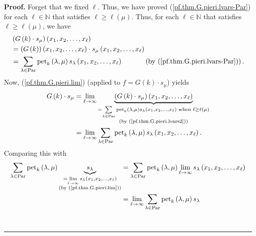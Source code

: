 \documentclass[numbers=enddot,12pt,final,onecolumn,notitlepage]{scrartcl}%
\theoremstyle{definition}
\newenvironment{proof}[1][Proof]{\noindent\textbf{#1.} }{\ \rule{0.5em}{0.5em}}
\let\sumnonlimits\sum
\renewcommand{\sum}{\sumnonlimits\limits}
\newenvironment{verlong}{}{}
\begin{document}
\begin{verlong}
\begin{proof}
Forget that we fixed $\ell$. Thus, we have proved
(\ref{pf.thm.G.pieri.lvars-Par}) for each $\ell\in\mathbb{N}$ that satisfies
$\ell\geq\ell\left(  \mu\right)  $. Thus, for each $\ell\in\mathbb{N}$ that
satisfies $\ell\geq\ell\left(  \mu\right)  $, we have%
\begin{align}
&  \left(  G\left(  k\right)  \cdot s_{\mu}\right)  \left(  x_{1},x_{2}%
,\ldots,x_{\ell}\right) \nonumber\\
&  =\left(  G\left(  k\right)  \right)  \left(  x_{1},x_{2},\ldots,x_{\ell
}\right)  \cdot s_{\mu}\left(  x_{1},x_{2},\ldots,x_{\ell}\right) \nonumber\\
&  =\sum_{\lambda\in\operatorname*{Par}}\operatorname*{pet}\nolimits_{k}%
\left(  \lambda,\mu\right)  s_{\lambda}\left(  x_{1},x_{2},\ldots,x_{\ell
}\right)  \ \ \ \ \ \ \ \ \ \ \left(  \text{by (\ref{pf.thm.G.pieri.lvars-Par}%
)}\right)  . \label{pf.thm.G.pieri.lvars2}%
\end{align}
Now, (\ref{pf.thm.G.pieri.lim}) (applied to $f=G\left(  k\right)  \cdot
s_{\mu}$) yields%
\begin{align*}
G\left(  k\right)  \cdot s_{\mu}  &  =\lim\limits_{\ell\rightarrow\infty
}\underbrace{\left(  G\left(  k\right)  \cdot s_{\mu}\right)  \left(
x_{1},x_{2},\ldots,x_{\ell}\right)  }_{\substack{=\sum_{\lambda\in
\operatorname*{Par}}\operatorname*{pet}\nolimits_{k}\left(  \lambda
,\mu\right)  s_{\lambda}\left(  x_{1},x_{2},\ldots,x_{\ell}\right)  \text{
when }\ell\geq\ell\left(  \mu\right)  \\\text{(by (\ref{pf.thm.G.pieri.lvars2}%
))}}}\\
&  =\lim\limits_{\ell\rightarrow\infty}\sum_{\lambda\in\operatorname*{Par}%
}\operatorname*{pet}\nolimits_{k}\left(  \lambda,\mu\right)  s_{\lambda
}\left(  x_{1},x_{2},\ldots,x_{\ell}\right)  .
\end{align*}
Comparing this with%
\begin{align*}
\sum_{\lambda\in\operatorname*{Par}}\operatorname*{pet}\nolimits_{k}\left(
\lambda,\mu\right)  \underbrace{s_{\lambda}}_{\substack{=\lim\limits_{\ell
\rightarrow\infty}s_{\lambda}\left(  x_{1},x_{2},\ldots,x_{\ell}\right)
\\\text{(by (\ref{pf.thm.G.pieri.lim}))}}}  &  =\sum_{\lambda\in
\operatorname*{Par}}\operatorname*{pet}\nolimits_{k}\left(  \lambda
,\mu\right)  \lim\limits_{\ell\rightarrow\infty}s_{\lambda}\left(  x_{1}%
,x_{2},\ldots,x_{\ell}\right) \\
&  =\lim\limits_{\ell\rightarrow\infty}\sum_{\lambda\in\operatorname*{Par}%
}\operatorname*{pet}\nolimits_{k}\left(  \lambda,\mu\right)  s_{\lambda
}
\end{align*}
\end{proof}
\end{verlong}
\end{document}
